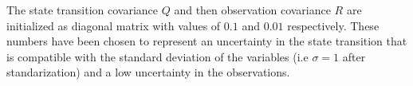 \documentclass{article}
\newcommand{\norm}[3]{\mathcal{N}\left(#1; #2, #3\right)} %
\begin{document}






The state transition covariance $Q$ and then observation covariance $R$ are initialized as diagonal matrix with values of $0.1$ and $0.01$ respectively. These numbers have been chosen to represent an uncertainty in the state transition that is compatible with the standard deviation of the variables (i.e $\sigma = 1$ after standarization) and a low uncertainty in the observations. 
\end{document}
